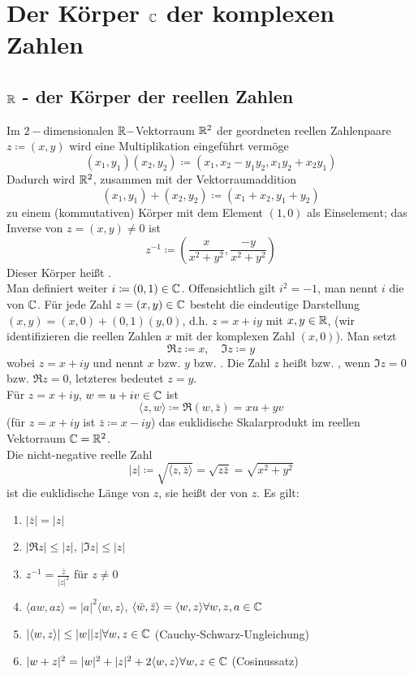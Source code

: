 \chapter{Der K\"orper $ \mathbb{C} $ der komplexen Zahlen}
\section{$ \mathbb{R} $ - der K\"orper der reellen Zahlen}
Im $ 2- $dimensionalen $ \mathbb{R}- $Vektorraum $ \mathbb{R}^2 $ der geordneten reellen Zahlenpaare $ z\coloneqq(x,y) $ wird eine Multiplikation eingef\"uhrt verm\"oge
\[ (x_1,y_1)(x_2,y_2)\coloneqq(x_1,x_2-y_1y_2, x_1y_2+x_2y_1) \]
Dadurch wird $ \mathbb{R}^2 $, zusammen mit der Vektorraumaddition
\[ (x_1,y_1)+(x_2,y_2)\coloneqq (x_1+x_2,y_1+y_2) \]
zu einem (kommutativen) K\"orper mit dem Element $ (1,0) $ als Einselement; das Inverse von $ z=(x,y)\neq 0 $ ist
\[ z^{-1}\coloneqq\left(\frac{x}{x^2+y^2},\frac{-y}{x^2+y^2}\right) \]
Dieser K\"orper hei\ss t .\\
Man definiert weiter $ i\coloneqq (0,1)\in\mathbb{C} $. Offensichtlich gilt $ i^2=-1 $, man nennt $ i $ die  von $ \mathbb{C} $. F\"ur jede Zahl $ z=(x,y)\in\mathbb{C} $ besteht die eindeutige Darstellung $ (x,y)=(x,0)+(0,1)(y,0) $, d.h. $ z=x+iy $ mit $ x,y\in\mathbb{R} $, (wir identifizieren die reellen Zahlen $ x $ mit der komplexen Zahl $ (x,0) $). Man setzt
\[ \Re z\coloneqq x,\quad \Im z\coloneqq y \]
wobei $ z=x+iy $ und nennt $ x $ bzw. $ y $  bzw. . Die Zahl $ z $ hei\ss t  bzw. , wenn $ \Im z=0 $ bzw. $ \Re z = 0 $, letzteres bedeutet $ z=y $.
\\
F\"ur $ z=x+iy $, $ w=u+iv \in\mathbb{C}$ ist \[ \langle z,w\rangle\coloneqq\Re(w,\bar z)=xu+yv \]
(f\"ur $ z=x+iy $ ist $ \bar z\coloneqq x-iy $) das euklidische Skalarprodukt im reellen Vektorraum $ \mathbb{C}=\mathbb{R}^2 $.\\
Die nicht-negative reelle Zahl \[ |z|\coloneqq\sqrt{\langle z,\bar z\rangle}=\sqrt{z\bar z}=\sqrt{x^2+y^2} \]
ist die euklidische L\"ange von $ z $, sie hei\ss t der  von $ z $. Es gilt:
\begin{enumerate}
\item $ |\bar z|=|z| $
\item $ |\Re z|\leq|z| $, $ |\Im z|\leq |z| $
\item $ z^{-1}=\frac{\bar z}{|z|^2} $ f\"ur $ z\neq 0 $
\item $ \langle aw, az\rangle=|a|^2\langle w,z\rangle $, $ \langle\bar w,\bar z\rangle=\langle w,z\rangle\forall w,z,a\in\mathbb{C} $
\item
$|\langle w,z\rangle|\leq|w||z|\forall w,z\in\mathbb{C}$ (Cauchy-Schwarz-Ungleichung)

\item
$|w+z|^2=|w|^2+|z|^2+2\langle w,z\rangle\forall w,z\in\mathbb{C} $ (Cosinussatz)
\end{enumerate}
